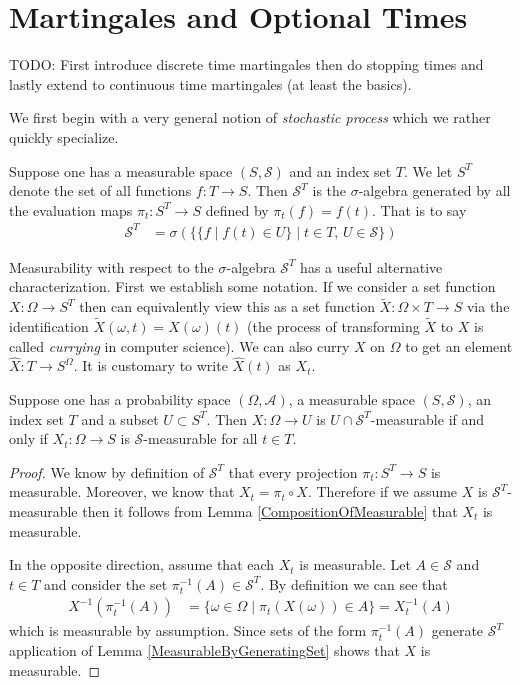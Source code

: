 \section{Martingales and Optional Times}
TODO:  First introduce discrete time martingales then do stopping
times and lastly extend to continuous time martingales (at least the
basics).

We first begin with a very general notion of \emph{stochastic process}
which we rather quickly specialize.  
\begin{defn}Suppose one has a measurable space $(S, \mathcal{S})$ and an
  index set $T$.  We let $S^T$ denote the set of all functions $f : T
  \to S$.  Then $\mathcal{S}^T$ is the $\sigma$-algebra generated by
  all the evaluation maps $\pi_t : S^T \to S$ defined by $\pi_t(f) =
  f(t)$.  That is to say
\begin{align*}
\mathcal{S}^T &= \sigma \left ( \lbrace \lbrace f \mid f(t) \in U
  \rbrace \mid t \in T \text{, } U \in
  \mathcal{S} \rbrace\right )
\end{align*}
\end{defn}
Measurability with respect to the $\sigma$-algebra $\mathcal{S}^T$ has a useful
alternative characterization.  First we establish some notation.  If
we consider a set function $X : \Omega \to S^T$ then can equivalently
view this as a set function $\tilde{X} : \Omega \times T \to S$ via the
identification $\tilde{X}(\omega, t) = X(\omega)(t)$ (the process of
transforming $\tilde{X}$ to $X$  is called
\emph{currying} in computer science).  We can also curry $X$ on $\Omega$
 to get an element $\hat{X} : T \to S^\Omega$.  It is customary to
write $\hat{X}(t)$ as $X_t$.
\begin{lem}\label{ProcessMeasurableProjections}Suppose one has a probability space $(\Omega,
  \mathcal{A})$, a measurable space $(S, \mathcal{S})$, an
  index set $T$ and a subset $U \subset S^T$.  Then $X : \Omega \to U$
  is $U \cap \mathcal{S}^T$-measurable if and only if $X_t : \Omega
  \to S$ is $\mathcal{S}$-measurable for all $t \in T$.
\end{lem}
\begin{proof}
We know by definition of $\mathcal{S}^T$ that every projection $\pi_t
: S^T \to S$ is measurable.  Moreover, we know that $X_t = \pi_t \circ
X$.  Therefore if we assume $X$ is
$\mathcal{S}^T$-measurable then it follows from Lemma
\ref{CompositionOfMeasurable} that $X_t$ is measurable.

In the opposite direction, assume that each $X_t$ is measurable.  Let
$A \in \mathcal{S}$ and $t \in T$ and consider the set $\pi_t^{-1}(A)
\in \mathcal{S}^T$.  By definition we can see that
\begin{align*}
X^{-1}(\pi_t^{-1}(A)) &= \lbrace \omega \in \Omega \mid
\pi_t(X(\omega)) \in A \rbrace = X_t^{-1}(A)
\end{align*}
which is measurable by assumption.  Since sets of the form
$\pi_t^{-1}(A)$ generate $\mathcal{S}^T$ application of Lemma \ref{MeasurableByGeneratingSet}
shows that $X$ is measurable.
\end{proof}

